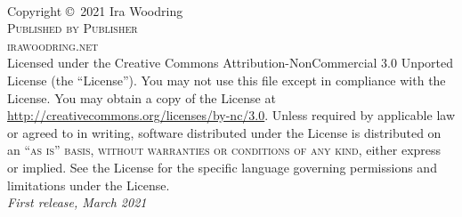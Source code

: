 \documentclass[11pt,fleqn]{book} %
\begin{document}

\begingroup
\thispagestyle{empty} %
\vfill
\endgroup


\newpage
~\vfill
\thispagestyle{empty}

\noindent Copyright \copyright\ 2021 Ira Woodring\\ %

\noindent \textsc{Published by Publisher}\\ %

\noindent \textsc{irawoodring.net}\\ %

\noindent Licensed under the Creative Commons Attribution-NonCommercial 3.0 Unported License (the ``License''). You may not use this file except in compliance with the License. You may obtain a copy of the License at \url{http://creativecommons.org/licenses/by-nc/3.0}. Unless required by applicable law or agreed to in writing, software distributed under the License is distributed on an \textsc{``as is'' basis, without warranties or conditions of any kind}, either express or implied. See the License for the specific language governing permissions and limitations under the License.\\ %

\noindent \textit{First release, March 2021} %
\end{document}
